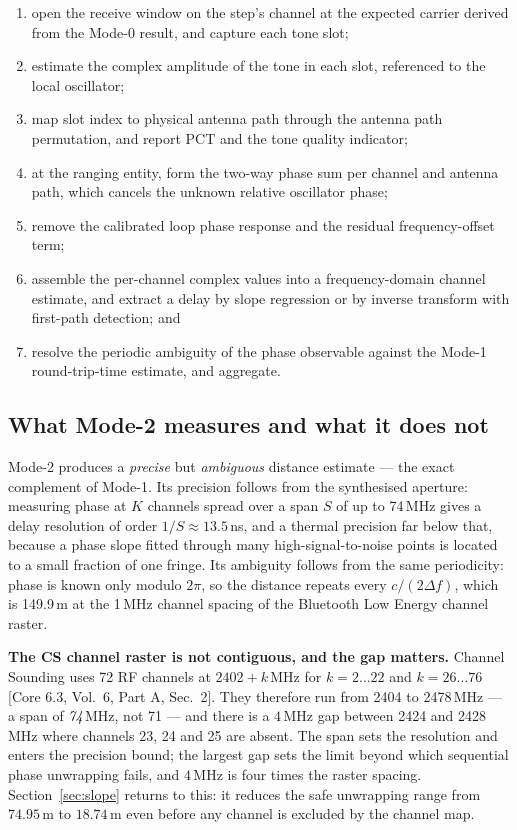 \documentclass[11pt,a4paper]{article}
\newcommand{\PCT}{\mathrm{PCT}}
\newcommand{\core}[1]{\textcolor{rulegrey}{\small[Core 6.3, #1]}}
\begin{document}
\begin{enumerate}[leftmargin=1.6em,itemsep=1pt]
  \item open the receive window on the step's channel at the expected carrier derived from the
        Mode-0 result, and capture each tone slot;
  \item estimate the complex amplitude of the tone in each slot, referenced to the local oscillator;
  \item map slot index to physical antenna path through the antenna path permutation, and report
        $\PCT$ and the tone quality indicator;
  \item at the ranging entity, form the two-way phase sum per channel and antenna path, which
        cancels the unknown relative oscillator phase;
  \item remove the calibrated loop phase response and the residual frequency-offset term;
  \item assemble the per-channel complex values into a frequency-domain channel estimate, and
        extract a delay by slope regression or by inverse transform with first-path detection; and
  \item resolve the periodic ambiguity of the phase observable against the Mode-1 round-trip-time
        estimate, and aggregate.
\end{enumerate}

\subsection{What Mode-2 measures and what it does not}

Mode-2 produces a \emph{precise} but \emph{ambiguous} distance estimate --- the exact complement of
Mode-1. Its precision follows from the synthesised aperture: measuring phase at $K$ channels spread
over a span $S$ of up to 74\,MHz gives a delay resolution of order $1/S \approx 13.5$\,ns, and a
thermal precision far below that, because a phase slope fitted through many high-signal-to-noise
points is located to a small fraction of one fringe. Its ambiguity follows from the same
periodicity: phase is known only modulo $2\pi$, so the distance repeats every $c/(2\Delta f)$, which
is 149.9\,m at the 1\,MHz channel spacing of the Bluetooth Low Energy channel raster.

\begin{callout}
\textbf{The CS channel raster is not contiguous, and the gap matters.} Channel Sounding uses 72 RF
channels at $2402+k$\,MHz for $k = 2\ldots22$ and $k = 26\ldots76$
\core{Vol.\ 6, Part A, Sec.\ 2}. They therefore run from 2404 to 2478\,MHz --- a span of
\emph{74}\,MHz, not 71 --- and there is a $4$\,MHz gap between 2424 and 2428\,MHz where channels
23, 24 and 25 are absent. The span sets the resolution and enters the precision bound; the largest
gap sets the limit beyond which sequential phase unwrapping fails, and $4$\,MHz is four times the
raster spacing. Section~\ref{sec:slope} returns to this: it reduces the safe unwrapping range from
$74.95$\,m to $18.74$\,m even before any channel is excluded by the channel map.
\end{callout}
\end{document}
